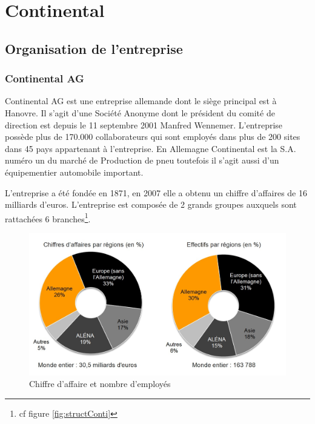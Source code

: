\chapter{Continental}
	\section{Organisation de l'entreprise}
		\subsection{Continental AG}
		Continental AG est une entreprise allemande dont le siège principal est à Hanovre. Il s'agit d'une Société Anonyme dont le président du comité de
		direction est depuis le 11 septembre 2001 Manfred Wennemer. L'entreprise possède plus de 170.000 collaborateurs qui sont employés dans plus de 200 sites
		dans 45 pays appartenant à l'entreprise. En Allemagne Continental est la S.A. numéro un du marché de Production de pneu toutefois il s'agit aussi d'un équipementier automobile important. 

		L'entreprise a été fondée en 1871, en 2007 elle a obtenu un chiffre d'affaires de 16 milliards d'euros. L'entreprise est composée de 2 grands groupes auxquels sont rattachées 6 branches\footnote{cf figure \ref{fig:structConti}}.
		 
		 \begin{figure}[H]
		 	\centering
		 	\includegraphics[width=12cm]{contents/images/caConti.jpg}
		 	\caption{Chiffre d'affaire et nombre d'employés}
		 	\label{fig:caConti}
		 \end{figure}

